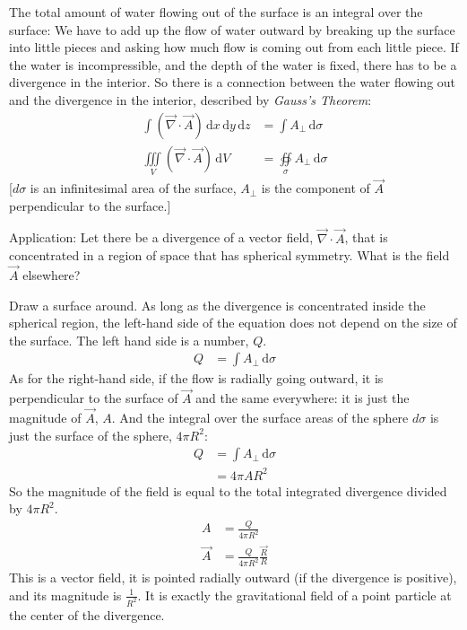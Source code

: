 \documentclass[pagesize,headsepline,10pt,parskip=half,BCOR=12mm]{scrreprt}
\begin{document}
        The total amount of water flowing out of the surface is an
        integral over the surface: We have to add up the flow of
        water outward by breaking up the surface into little pieces
        and asking how much flow is coming out from each little
        piece. If the water is incompressible, and the depth of the
        water is fixed, there has to be a divergence in the
        interior.  So there is a connection between the water
        flowing out and the divergence in the interior, described
        by \emph{Gauss's Theorem}:
        \begin{align}\label{eq:gauss}
          \int (\vec \nabla \cdot \vec A)\, \mathrm{d}x\,
          \mathrm{d}y\, \mathrm{d}z &= \int A_\perp\,
          \mathrm{d}\sigma
          \\
          \iiint\limits_V(\vec \nabla \cdot \vec A)\, \mathrm{d}V
          &= \oiint \limits_{\sigma} A_\perp\, \mathrm{d}\sigma
        \end{align}
        [$d\sigma$ is an infinitesimal area of the surface,
        $A_\perp$ is the component of $\vec A$ perpendicular to the
        surface.]

        Application: Let there be a divergence of a vector
        field, $\vec \nabla \cdot \vec A$, that is concentrated in
        a region of space that has spherical symmetry.  What is the
        field $\vec A$ elsewhere?

        Draw a surface around.  As long as the divergence is
        concentrated inside the spherical region, the left-hand
        side of the equation does not depend on the size of the
        surface.  The left hand side is a number, $Q$.
        \begin{align}\label{eq:gauss}
          Q &= \int A_\perp\, \mathrm{d}\sigma
        \end{align}
        As for the right-hand side, if the flow is radially going
        outward, it is perpendicular to the surface of $\vec A$
        and the same everywhere: it is just the magnitude of
        $\vec A$, $A$.  And the integral over the surface areas of
        the sphere $d \sigma$ is just the surface of the sphere,
        $4 \pi R^2$:
        \begin{align}
          Q &= \int A_\perp\, \mathrm{d}\sigma \\
            &= 4 \pi A R^2
        \end{align}
        So the magnitude of the field is equal to the total
        integrated divergence divided by $4\pi R^2$.
        \begin{align}
          A &= \frac{Q}{4 \pi R^2} \\
          \vec A &= \frac{Q}{4 \pi R^2} \frac{\vec R}{R}
        \end{align}
        This is a vector field, it is pointed radially outward (if
        the divergence is positive), and its magnitude is
        $\frac{1}{R^2}$.  It is exactly the gravitational field of
        a point particle at the center of the divergence.
\end{document}
